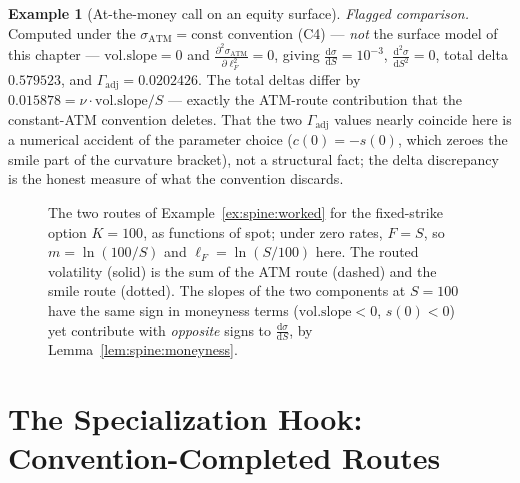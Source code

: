 \documentclass[11pt]{book}
\theoremstyle{plain}
\theoremstyle{definition}
\newtheorem{example}[theorem]{Example}
\theoremstyle{remark}
\newcommand{\mln}{m}                             %
\newcommand{\lF}{\ell_F}                         %
\newcommand{\ssm}{\sigma_{\mathrm{smile}}}       %
\newcommand{\satm}{\sigma_{\mathrm{ATM}}}        %
\newcommand{\volslope}{\mathrm{vol.slope}}       %
\newcommand{\vega}{\nu}                          %
\newcommand{\Gadj}{\Gamma_{\mathrm{adj}}}        %
\newcommand{\dd}{\mathrm{d}}                                  %
\newcommand{\pdd}[2]{\frac{\partial^2 #1}{\partial #2^2}}     %
\newcommand{\td}[2]{\frac{\dd #1}{\dd #2}}                    %
\begin{document}
\begin{example}[At-the-money call on an equity surface]
\emph{Flagged comparison.} Computed under the $\satm = \mathrm{const}$
convention (C4) --- \emph{not} the surface model of
this chapter --- $\volslope = 0$ and $\pdd{\satm}{\lF} = 0$,
giving $\td{\sigma}{S} = 10^{-3}$, $\frac{\dd^2\sigma}{\dd S^2} = 0$,
total delta $0.579523$, and $\Gadj = 0.0202426$. The total deltas differ by
$0.015878 = \vega \cdot \volslope / S$ --- exactly the ATM-route contribution
that the constant-ATM convention deletes. That the two $\Gadj$ values nearly
coincide here is a numerical accident of the parameter choice
($c(0) = -s(0)$, which zeroes the smile part of the curvature bracket), not a
structural fact; the delta discrepancy is the honest measure of what the
convention discards.
\end{example}

\begin{figure}[ht]
\centering
{}
\caption{The two routes of Example~\ref{ex:spine:worked} for the fixed-strike
option $K = 100$, as functions of spot; under zero rates, $F = S$, so
$\mln = \ln(100/S)$ and $\lF = \ln(S/100)$ here. The routed volatility (solid)
is the sum of the ATM route (dashed) and the smile route (dotted). The slopes
of the two components at $S = 100$ have the same sign in moneyness terms
($\volslope < 0$, $s(0) < 0$) yet contribute with \emph{opposite} signs to
$\td{\sigma}{S}$, by Lemma~\ref{lem:spine:moneyness}.}
\label{fig:spine:routes-plot}
\end{figure}

\section{The Specialization Hook: Convention-Completed Routes}\label{sec:spine:hook}
\end{document}

